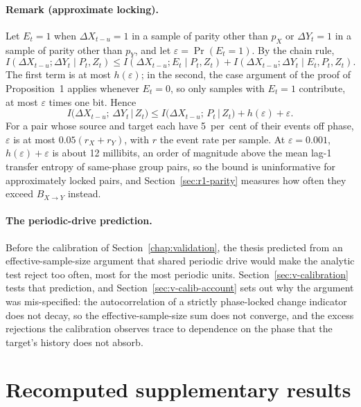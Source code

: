 \paragraph{Remark (approximate locking).}
Let $E_t = 1$ when $\Delta X_{t-u} = 1$ in a sample of parity other than $p_X$ or $\Delta Y_t = 1$ in a sample of parity other than $p_Y$, and let $\varepsilon = \Pr(E_t = 1)$. By the chain rule,
\[
  I(\Delta X_{t-u}; \Delta Y_t \mid P_t, Z_t) \le I(\Delta X_{t-u}; E_t \mid P_t, Z_t) + I(\Delta X_{t-u}; \Delta Y_t \mid E_t, P_t, Z_t).
\]
The first term is at most $h(\varepsilon)$; in the second, the case argument of the proof of Proposition~1 applies whenever $E_t = 0$, so only samples with $E_t = 1$ contribute, at most $\varepsilon$ times one bit. Hence
\begin{equation*}
  I\big(\Delta X_{t-u};\, \Delta Y_t \,\big|\, Z_t\big)
  \le I\big(\Delta X_{t-u};\, P_t \,\big|\, Z_t\big) + h(\varepsilon) + \varepsilon.
\end{equation*}
For a pair whose source and target each have 5~per~cent of their events off phase, $\varepsilon$ is at most $0.05(r_X + r_Y)$, with $r$ the event rate per sample. At $\varepsilon = 0.001$, $h(\varepsilon) + \varepsilon$ is about 12 millibits, an order of magnitude above the mean lag-1 transfer entropy of same-phase group pairs, so the bound is uninformative for approximately locked pairs, and Section~\ref{sec:r1-parity} measures how often they exceed $B_{X\to Y}$ instead.

\paragraph{The periodic-drive prediction.}
Before the calibration of Section~\ref{chap:validation}, the thesis predicted from an effective-sample-size argument that shared periodic drive would make the analytic test reject too often, most for the most periodic units. Section~\ref{sec:v-calibration} tests that prediction, and Section~\ref{sec:v-calib-account} sets out why the argument was mis-specified: the autocorrelation of a strictly phase-locked change indicator does not decay, so the effective-sample-size sum does not converge, and the excess rejections the calibration observes trace to dependence on the phase that the target's history does not absorb.




\clearpage

\clearpage

\section{Recomputed supplementary results}
\suppressfloats[t]
\label{app:recompute}

